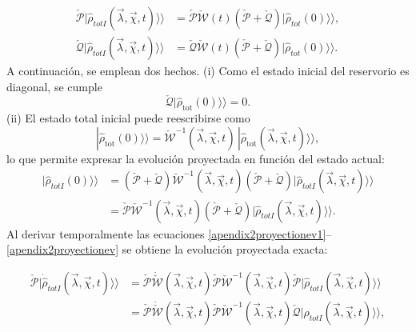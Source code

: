 \begin{appendixs}
\begin{align}
\check{\mathcal{P}}|\hat{\rho}_{totI}(\vec{\lambda},\vec{\chi},t)\rangle \rangle &=  \check{\mathcal{P}} \check{\mathcal{W}}(t)( \check{\mathcal{P}} +  \check{\mathcal{Q}})|\hat{\rho}_{tot}(0)\rangle \rangle , \label{apendix2proyectionev1}\\
\check{\mathcal{Q}}|\hat{\rho}_{totI}(\vec{\lambda},\vec{\chi},t)\rangle \rangle &= \check{\mathcal{Q}} \check{\mathcal{W}}(t)( \check{\mathcal{P}} +  \check{\mathcal{Q}})|\hat{\rho}_{tot}(0)\rangle \rangle .
\label{apendix2proyectionev}
\end{align}
A continuación, se emplean dos hechos. (i) Como el estado inicial del reservorio es diagonal, se cumple
\[
\check{\mathcal{Q}}|\hat{\rho}_{\mathrm{tot}}(0)\rangle\rangle = 0.
\]
(ii) El estado total inicial puede reescribirse como
\[
|\hat{\rho}_{\mathrm{tot}}(0)\rangle\rangle = \check{\mathcal{W}}^{-1}(\vec{\lambda}, \vec{\chi}, t)\, |\hat{\rho}_{\mathrm{tot}}(\vec{\lambda}, \vec{\chi}, t)\rangle\rangle,
\]
lo que permite expresar la evolución proyectada en función del estado actual:
\begin{align*}
|\hat{\rho}_{totI}(0)\rangle \rangle &= (\check{\mathcal{P}} + \check{\mathcal{Q}} )\check{\mathcal{W}}^{-1}(\vec{\lambda},\vec{\chi},t)(\check{\mathcal{P}} + \check{\mathcal{Q}})|\hat{\rho}_{totI}(\vec{\lambda},\vec{\chi},t)\rangle \rangle \\
&= \check{\mathcal{P}}\check{\mathcal{W}}^{-1}(\vec{\lambda},\vec{\chi},t)(\check{\mathcal{P}} + \check{\mathcal{Q}})|\hat{\rho}_{totI}(\vec{\lambda},\vec{\chi},t)\rangle \rangle .
\end{align*}
Al derivar temporalmente las ecuaciones \eqref{apendix2proyectionev1}–\eqref{apendix2proyectionev} se obtiene la evolución proyectada exacta:

\begin{align*}
\check{\mathcal{P}}|\dot{\hat{\rho}}_{totI}(\vec{\lambda},\vec{\chi},t) \rangle \rangle &= \check{\mathcal{P}}\dot{\check{\mathcal{W}}}(\vec{\lambda},\vec{\chi},t)\check{\mathcal{P}}\check{\mathcal{W}}^{-1}(\vec{\lambda},\vec{\chi},t)\check{\mathcal{P}}|\hat{\rho}_{totI}(\vec{\lambda},\vec{\chi},t)\rangle \rangle \\
&= \check{\mathcal{P}}\dot{\check{\mathcal{W}}}(\vec{\lambda},\vec{\chi},t)\check{\mathcal{P}}\check{\mathcal{W}}^{-1}(\vec{\lambda},\vec{\chi},t)\check{\mathcal{Q}}|\hat{\rho}_{totI}(\vec{\lambda},\vec{\chi},t)\rangle \rangle ,
\end{align*}


\end{appendixs}
